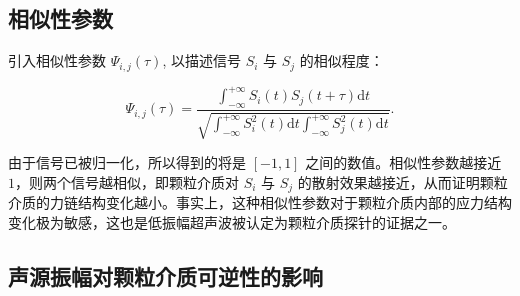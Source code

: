 \subsection{相似性参数}

引入相似性参数 $\Psi_{i,j}(\tau)$, 以描述信号 $S_{i}$ 与 $S_{j}$ 的相似程度\cite{PhysRevLett.90.174302}：

\begin{equation}
  \Psi_{i,j}(\tau) = \frac{\int_{-\infty}^{+\infty}S_{i}(t)S_{j}(t+\tau)\mathrm{d}t}{\sqrt{\int_{-\infty}^{+\infty}S_{i}^{2}(t)\mathrm{d}t\int_{-\infty}^{+\infty}S_{j}^{2}(t)\mathrm{d}t}}.
\end{equation}

由于信号已被归一化，所以得到的将是 $[-1,1]$ 之间的数值。相似性参数越接近 $1$，则两个信号越相似，即颗粒介质对 $S_{i}$ 与 $S_{j}$ 的散射效果越接近，从而证明颗粒介质的力链结构变化越小。事实上，这种相似性参数对于颗粒介质内部的应力结构变化极为敏感，这也是低振幅超声波被认定为颗粒介质探针的证据之一。

\subsection{声源振幅对颗粒介质可逆性的影响}